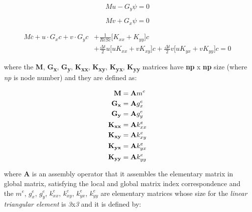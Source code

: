 \begin{equation}
 Mu - G_y \psi = 0
\end{equation}

\begin{equation}
 Mv + G_x \psi = 0
\end{equation}

\begin{equation}
\begin{aligned}
 M \overset{.}{c} + u \cdot G_x c + v \cdot G_y c & + \frac{1}{\textit{ReSc}} \Big[ K_{xx} + K_{yy} \Big] c
 \\[5pt]
 & + \frac{\Delta t}{2} u \Big[ u K_{xx} + v K_{xy} \Big] c
 + \frac{\Delta t}{2} v \Big[ u K_{yx} + v K_{yy} \Big] c 
 = 0 \label{concentration matrix}
\end{aligned} 
\end{equation}

\medskip
\noindent
where the \textbf{M}, \textbf{G\textsubscript{x}}, 
\textbf{G\textsubscript{y}}, \textbf{K\textsubscript{xx}},
\textbf{K\textsubscript{xy}},
\textbf{K\textsubscript{yx}}, 
\textbf{K\textsubscript{yy}} matrices
have \textbf{np} x \textbf{np} size
(where \textit{np} is node number) and
they are defined as:

\begin{align}
  \textbf{M} & = \textbf{A} m^{e}\\
  \textbf{G\textsubscript{x}} & = \textbf{A} g_{x}^{e}\\
  \textbf{G\textsubscript{y}} & = \textbf{A} g_{y}^{e} \\
  \textbf{K\textsubscript{xx}} & = \textbf{A} k_{xx}^{e} \\
  \textbf{K\textsubscript{xy}} & = \textbf{A} k_{xy}^{e} \\
  \textbf{K\textsubscript{yx}} & = \textbf{A} k_{yx}^{e} \\
  \textbf{K\textsubscript{yy}} & = \textbf{A} k_{yy}^{e}
\end{align}

\noindent
where \textbf{A} is an assembly operator
that it assembles the elementary matrix in
global matrix, satisfying the local and global matrix index
correspondence and the
$m^{e}$, 
$g^{e}_{x}$,
$g^{e}_{y}$,
$k^{e}_{xx}$,
$k^{e}_{xy}$,
$k^{e}_{yx}$,
$k^{e}_{yy}$
are elementary matrices whose
size for the  
\textit{linear triangular element} is \textit{3}x\textit{3} and
it is defined by:


